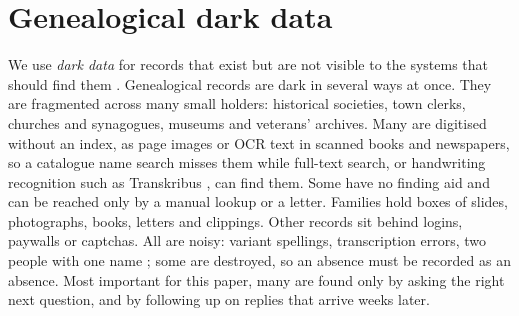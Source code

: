 \section{Genealogical dark data}
\label{sec:darkdata}

We use \emph{dark data} for records that exist but are not visible to the systems that should find them \citep{heidorn2008dark,hand2020dark}. Genealogical records are dark in several ways at once. They are fragmented across many small holders: historical societies, town clerks, churches and synagogues, museums and veterans' archives. Many are digitised without an index, as page images or OCR text in scanned books and newspapers, so a catalogue name search misses them while full-text search, or handwriting recognition such as Transkribus \citep{kahle2017transkribus}, can find them. Some have no finding aid and can be reached only by a manual lookup or a letter. Families hold boxes of slides, photographs, books, letters and clippings. Other records sit behind logins, paywalls or captchas. All are noisy: variant spellings, transcription errors, two people with one name \citep{fellegi1969linkage,abramitzky2021linking,price2021censustree}; some are destroyed, so an absence must be recorded as an absence. Most important for this paper, many are found only by asking the right next question, and by following up on replies that arrive weeks later.

\begin{center}

\end{center}
